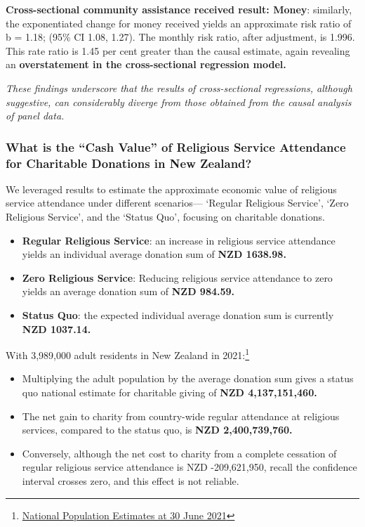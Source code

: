 \documentclass[
  single column]{article}
\providecommand{\tightlist}{%
  \setlength{\itemsep}{0pt}\setlength{\parskip}{0pt}}\usepackage{longtable,booktabs,array}
\begin{document}
\textbf{Cross-sectional community assistance received result: Money}:
similarly, the exponentiated change for money received yields an
approximate risk ratio of b = 1.18; (95\% CI 1.08, 1.27). The monthly
risk ratio, after adjustment, is 1.996. This rate ratio is 1.45 per cent
greater than the causal estimate, again revealing an
\textbf{overstatement in the cross-sectional regression model.}

\emph{These findings underscore that the results of cross-sectional
regressions, although suggestive, can considerably diverge from those
obtained from the causal analysis of panel data.}

\newpage{}

\subsubsection{What is the ``Cash Value'' of Religious Service
Attendance for Charitable Donations in New
Zealand?}\label{what-is-the-cash-value-of-religious-service-attendance-for-charitable-donations-in-new-zealand}

We leveraged results to estimate the approximate economic value of
religious service attendance under different scenarios--- `Regular
Religious Service', `Zero Religious Service', and the `Status Quo',
focusing on charitable donations.

\begin{itemize}
\tightlist
\item
  \textbf{Regular Religious Service}: an increase in religious service
  attendance yields an individual average donation sum of \textbf{NZD
  1638.98.}
\item
  \textbf{Zero Religious Service}: Reducing religious service attendance
  to zero yields an average donation sum of \textbf{NZD 984.59.}
\item
  \textbf{Status Quo}: the expected individual average donation sum is
  currently \textbf{NZD 1037.14.}
\end{itemize}

With 3,989,000 adult residents in New Zealand in 2021:\footnote{\href{https://www.stats.govt.nz/information-releases/national-population-estimates-at-30-june-2021}{National
  Population Estimates at 30 June 2021}}

\begin{itemize}
\tightlist
\item
  Multiplying the adult population by the average donation sum gives a
  status quo national estimate for charitable giving of \textbf{NZD
  4,137,151,460.}
\item
  The net gain to charity from country-wide regular attendance at
  religious services, compared to the status quo, is \textbf{NZD
  2,400,739,760.}
\item
  Conversely, although the net cost to charity from a complete cessation
  of regular religious service attendance is NZD -209,621,950, recall
  the confidence interval crosses zero, and this effect is not reliable.
\end{itemize}
\end{document}
